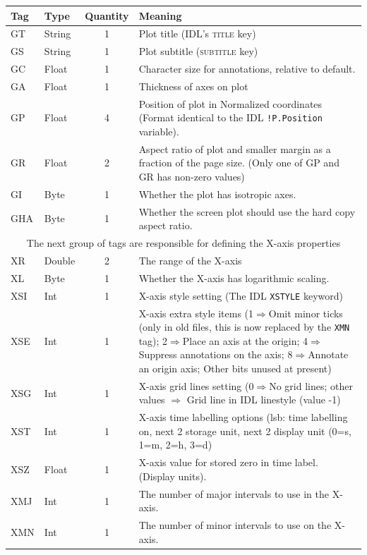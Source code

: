 \documentclass[english]{article}
\newcommand{\noun}[1]{\textsc{#1}}
\begin{document}
\begin{longtable}{|llcp{9cm}|}
  \hline Tag& Type& Quantity&
  Meaning\\
  \hline
  \endhead
  \hline
  \endfoot
  GT& String& 1&
  Plot title (IDL's \noun{title} key)\\
  GS& String& 1&
  Plot subtitle (\noun{subtitle} key)\\
  GC& Float& 1&
  Character size for annotations, relative to default.\\
  GA& Float & 1&
  Thickness of axes on plot\\
  GP& Float& 4& Position of plot in Normalized coordinates (Format
  identical to the
  IDL \texttt{!P.Position} variable).\\
  GR& Float& 2& Aspect ratio of plot and smaller margin as a fraction
  of the page
  size. (Only one of GP and GR has non-zero values)\\
  GI & Byte & 1 & Whether the plot has isotropic axes.\\
  GHA & Byte & 1 & Whether the screen plot should use the hard copy
  aspect ratio.\\
  \hline \multicolumn{4}{|c|}{The next group of tags are responsible
    for
    defining the X-axis properties}\\
  \hline XR& Double& 2&
  The range of the X-axis\\
  XL & Byte & 1 & Whether the X-axis has logarithmic scaling.\\
  XSI& Int& 1&
  X-axis style setting (The IDL \texttt{XSTYLE} keyword)\\
  XSE& Int& 1& X-axis extra style items (1$\Rightarrow$Omit minor ticks
  (only in old files, this is now replaced by the \texttt{XMN} tag);
  2$\Rightarrow$Place an axis at the origin; 4$\Rightarrow$Suppress
  annotations on the
  axis; 8$\Rightarrow$Annotate an origin axis; Other bits unused at present)\\
  XSG& Int& 1& X-axis grid lines setting (0$\Rightarrow$No grid lines;
  other values
  $\Rightarrow$ Grid line in IDL linestyle (value -1)\\
  XST& Int& 1& X-axis time labelling options (lsb: time labelling on,
  next 2 storage
  unit, next 2 display unit (0=s, 1=m, 2=h, 3=d)\\
  XSZ& Float& 1&
  X-axis value for stored zero in time label. (Display units).\\
  XMJ & Int & 1 & The number of major intervals to use in the X-axis.\\
  XMN & Int & 1 & The number of minor intervals to use on the X-axis.\\

\end{longtable}
\end{document}
